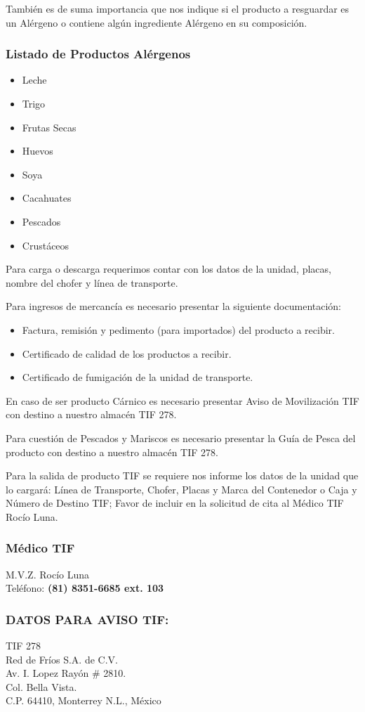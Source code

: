 También es de suma importancia que nos indique si el producto a resguardar es un Alérgeno o contiene algún ingrediente Alérgeno en su composición.

\subsubsection*{Listado de Productos Alérgenos}
\begin{itemize}
	\item Leche
	\item Trigo
	\item Frutas Secas
	\item Huevos
	\item Soya
	\item Cacahuates
	\item Pescados
	\item Crustáceos
\end{itemize}

Para carga o descarga requerimos contar con los datos de la unidad, placas, nombre del chofer y línea de transporte.

Para ingresos de mercancía es necesario presentar la siguiente documentación:

\begin{itemize}
	\item Factura, remisión y pedimento (para importados) del producto a recibir.
	\item Certificado de calidad de los productos a recibir.
	\item Certificado de fumigación de la unidad de transporte.
\end{itemize}

En caso de ser producto Cárnico es necesario presentar Aviso de Movilización TIF con destino a nuestro almacén TIF 278.

Para cuestión de Pescados y Mariscos es necesario presentar la Guía de Pesca del producto con destino a nuestro almacén TIF 278.

Para la salida de producto TIF se requiere nos informe los datos de la unidad que lo cargará: Línea de Transporte, Chofer, Placas y Marca del Contenedor o Caja y Número de Destino TIF; Favor de incluir en la solicitud de cita al Médico TIF Rocío Luna.

\subsubsection*{Médico TIF}
M.V.Z. Rocío Luna\\
Teléfono: \textbf{(81) 8351-6685 ext. 103}\\

\subsubsection*{DATOS PARA AVISO TIF:}
TIF 278\\
Red de Fríos S.A. de C.V.\\
Av. I. Lopez Rayón \# 2810.\\
Col. Bella Vista.\\
C.P. 64410, Monterrey N.L., México
